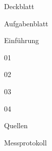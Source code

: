 \documentclass[11pt]{article}
\begin{document}

{Deckblatt}
\pagebreak

{Aufgabenblatt}
\pagebreak

\setcounter{section}{-1} 
\tableofcontents
\pagebreak

\setcounter{page}{1}

{Einführung}
\pagebreak

{01}
\pagebreak

{02}
\pagebreak

{03}
\pagebreak

{04}
\pagebreak

{Quellen}
\pagebreak

{Messprotokoll}
\end{document}
